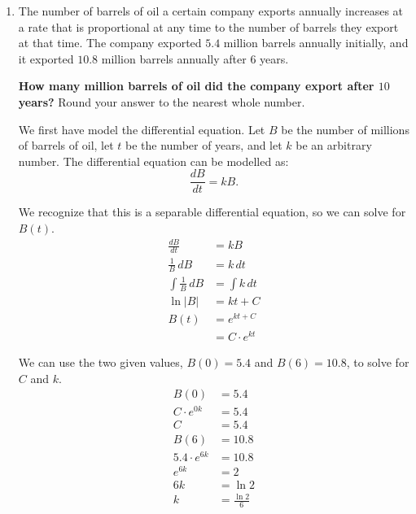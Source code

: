 \documentclass[12pt]{article}
\begin{document}
\begin{enumerate}
    \item The number of barrels of oil a certain company exports annually increases at a rate that is proportional at any time to the number of barrels they export at that time. The company exported $5.4$ million barrels annually initially, and it exported $10.8$ million barrels annually after $6$ years.

          \noindent \textbf{How many million barrels of oil did the company export after $10$ years?} Round your answer to the nearest whole number.

          \vspace{6mm}

          We first have model the differential equation. Let $B$ be the number of millions of barrels of oil, let $t$ be the number of years, and let $k$ be an arbitrary number. The differential equation can be modelled as:
          \[ \frac{dB}{dt} = kB. \]

          We recognize that this is a separable differential equation, so we can solve for $B(t)$.
          \begin{align*}
              \frac{dB}{dt}          & = kB             \\[6pt]
              \frac{1}{B} \, dB      & = k \, dt        \\[6pt]
              \int \frac{1}{B} \, dB & = \int k \, dt   \\[6pt]
              \ln|B|                 & = kt + C         \\
              B(t)                   & = e^{kt + C}     \\
                                     & = C \cdot e^{kt}
          \end{align*}

          We can use the two given values, $B(0) = 5.4$ and $B(6) = 10.8$, to solve for $C$ and $k$.
          \begin{align*}
              B(0)             & = 5.4             \\
              C \cdot e^{0k}   & = 5.4             \\
              C                & = 5.4             \\[10pt]
              B(6)             & = 10.8            \\
              5.4 \cdot e^{6k} & = 10.8            \\
              e^{6k}           & = 2               \\
              6k               & = \ln 2           \\
              k                & = \frac{\ln 2}{6}
          \end{align*}


\end{enumerate}
\end{document}
